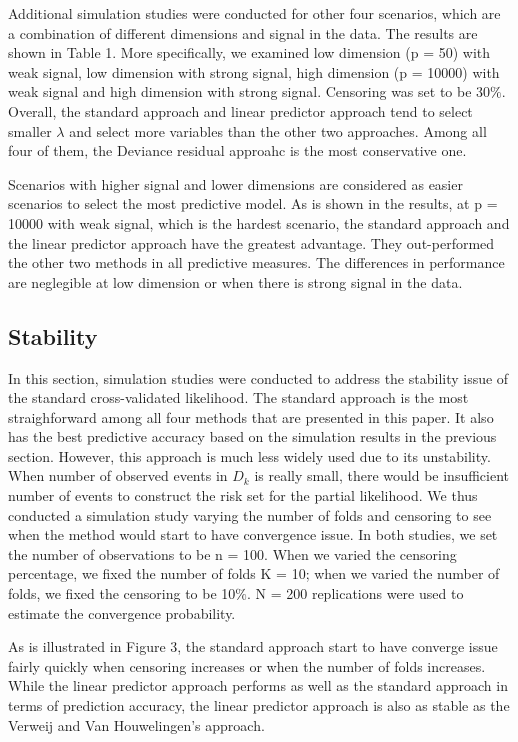 \par Additional simulation studies were conducted for other four scenarios, which are a combination of different dimensions and signal in the data. The results are shown in Table 1. More specifically, we examined low dimension (p = 50) with weak signal, low dimension with strong signal, high dimension (p = 10000) with weak signal and high dimension with strong signal. Censoring was set to be 30$\%$. Overall, the standard approach and linear predictor approach tend to select smaller $\lambda$ and select more variables than the other two approaches. Among all four of them, the Deviance residual approahc is the most conservative one.

\par Scenarios with higher signal and lower dimensions are considered as easier scenarios to select the most predictive model. As is shown in the results, at p = 10000 with weak signal, which is the hardest scenario, the standard approach and the linear predictor approach have the greatest advantage. They out-performed the other two methods in all predictive measures. The differences in performance are neglegible at low dimension or when there is strong signal in the data.

\subsection {Stability}
  
\par In this section, simulation studies were conducted to address the stability issue of the standard cross-validated likelihood. The standard approach is the most straighforward among all four methods that are presented in this paper. It also has the best predictive accuracy based on the simulation results in the previous section. However, this approach is much less widely used due to its unstability. When number of observed events in $D_k$ is really small, there would be insufficient number of events to construct the risk set for the partial likelihood. We thus conducted a simulation study varying the number of folds and censoring to see when the method would start to have convergence issue. In both studies, we set the number of observations to be n = 100. When we varied the censoring percentage, we fixed the number of folds K = 10; when we varied the number of folds, we fixed the censoring to be 10$\%$. N = 200 replications were used to estimate the convergence probability.
\par As is illustrated in Figure 3,  the standard approach start to have converge issue fairly quickly when censoring increases or when the number of folds increases. While the linear predictor approach performs as well as the standard approach in terms of prediction accuracy, the linear predictor approach is also as stable as the Verweij and Van Houwelingen's approach.

